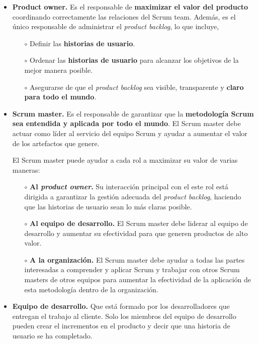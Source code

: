 \begin{itemize}
\item \textbf{Product owner.} Es el responsable de \textbf{maximizar el valor del producto} coordinando correctamente las relaciones del Scrum team. Además, es el único responsable de administrar el \textit{product backlog}, lo que incluye,

\begin{itemize}
    \item[$\circ$] Definir las \textbf{historias de usuario}.
    \item[$\circ$] Ordenar las \textbf{historias de usuario} para alcanzar los objetivos de la mejor manera posible.
    \item[$\circ$] Asegurarse de que el \textit{product backlog} sea visible, transparente y \textbf{claro para todo el mundo}.
\end{itemize}

\item \textbf{Scrum master.} Es el responsable de garantizar que la \textbf{metodología Scrum sea entendida y aplicada por todo el mundo}. El Scrum master debe actuar como líder al servicio del equipo Scrum y ayudar a aumentar el valor de los artefactos que genere. 

El Scrum master puede ayudar a cada rol a maximizar su valor de varias maneras:
 
\begin{itemize}
    \item[$\circ$] \textbf{Al \textit{product owner}.} Su interacción principal con el este rol está dirigida a garantizar la gestión adecuada del \textit{product backlog}, haciendo que las historias de usuario sean lo más claras posible.
    
    \item[$\circ$] \textbf{Al equipo de desarrollo.} El Scrum master debe liderar al equipo de desarrollo y aumentar su efectividad para que generen productos de alto valor.
    
    \item[$\circ$] \textbf{A la organización.} El Scrum master debe ayudar a todas las partes interesadas a comprender y aplicar Scrum y trabajar con otros Scrum masters de otros equipos para aumentar la efectividad de la aplicación de esta metodología dentro de la organización.
    
\end{itemize}

\item \textbf{Equipo de desarrollo.} Que está formado por los desarrolladores que entregan el trabajo al cliente. Solo los miembros del equipo de desarrollo pueden crear el incrementos en el producto y decir que una historia de usuario se ha completado.


\end{itemize}
